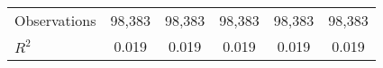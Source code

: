 \begin{table}[htpb!]
\begin{center}
{\begin{tabular}{lccccc}
Observations & 98,383 & 98,383 & 98,383 & 98,383 & 98,383 \\
 $R^2$ & 0.019 & 0.019 & 0.019 & 0.019 & 0.019 \\ \hline
\end{tabular}}
\end{center}
\end{table}
